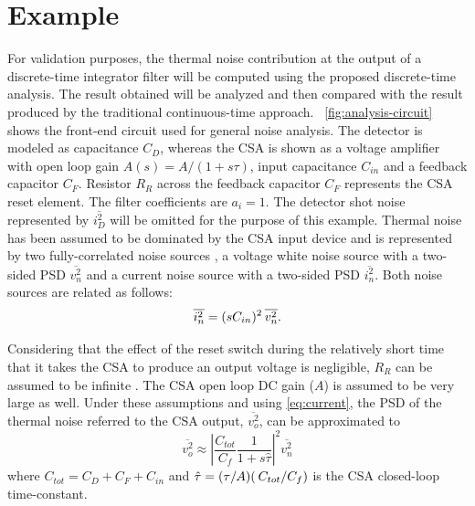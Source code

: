 \section{Example}
For validation purposes, the thermal noise contribution at the output of a \mbox{discrete-time} integrator filter will be computed using the proposed \mbox{discrete-time} analysis. The result obtained will be analyzed and then compared with the result produced by the traditional \mbox{continuous-time} approach. \figurename~\ref{fig:analysis-circuit} shows the front-end circuit used for general noise analysis. The detector is modeled as capacitance $C_D$, whereas the CSA is shown as a voltage amplifier with open loop gain $A(s) = A/(1+s\tau)$, input capacitance $C_{in}$ and a feedback capacitor $C_F$. Resistor $R_R$ across the feedback capacitor $C_F$ represents the CSA reset element. The filter coefficients are $a_i=1$. The detector shot noise represented by $\overline{i^2_D}$ will be omitted for the purpose of this example. Thermal noise has been assumed to be dominated by the CSA input device and is represented by two \mbox{fully-correlated} noise sources \citep{sansen101}, a voltage white noise source with a \mbox{two-sided} PSD $\overline{v_n^2}$ and a current noise source with a \mbox{two-sided} PSD $\overline{i_n^2}$. Both noise sources are related as follows:
\begin{equation} 
\overline{i_n^2} = (sC_{in})^2 \hspace{0.2em}\overline{v_n^2}\label{eq:current}.
\end{equation}

Considering that the effect of the reset switch during the relatively short time that it takes the CSA to produce an output voltage is negligible, $R_R$ can be assumed to be infinite \citep{pullia102}. The CSA open loop DC gain ($A$) is assumed to be very large as well. Under these assumptions and using \eqref{eq:current}, the PSD of the thermal noise referred to the CSA output, $\overline{v_o^2}$, can be approximated to
\begin{equation} 
	\overline{v_o^2} \approx \left|\frac{C_{tot}}{C_f} \frac{1}{1+s\hat{\tau}}\right|^2\overline{v_n^2} \label{eq:ex-PSD}
\end{equation}
where $C_{tot} = C_D+C_F+C_{in}$ and $\hat{\tau} = (\tau/A) (\hspace{0.2em}C_{tot}/C_f)$ is the CSA \mbox{closed-loop} \mbox{time-constant}.

